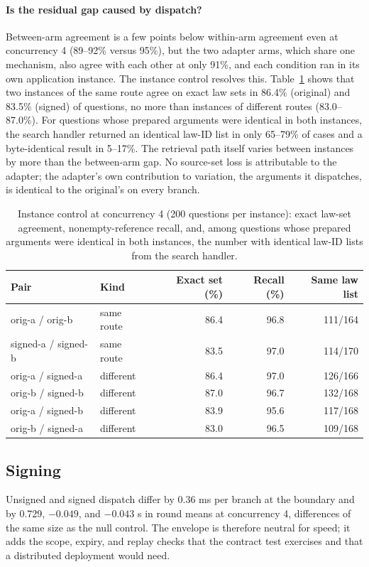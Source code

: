 \documentclass[paper]{ieice}
\begin{document}
\paragraph{Is the residual gap caused by dispatch?}
Between-arm agreement is a few points below within-arm agreement even at concurrency 4 (89--92\% versus 95\%), but the two adapter arms, which share one mechanism, also agree with each other at only 91\%, and each condition ran in its own application instance. The instance control resolves this. Table~\ref{tab:instance-followup} shows that two instances of the same route agree on exact law sets in 86.4\% (original) and 83.5\% (signed) of questions, no more than instances of different routes (83.0--87.0\%). For questions whose prepared arguments were identical in both instances, the search handler returned an identical law-ID list in only 65--79\% of cases and a byte-identical result in 5--17\%. The retrieval path itself varies between instances by more than the between-arm gap. No source-set loss is attributable to the adapter; the adapter's own contribution to variation, the arguments it dispatches, is identical to the original's on every branch.

\begin{table}[!htbp]
\caption{Instance control at concurrency 4 (200 questions per instance): exact law-set agreement, nonempty-reference recall, and, among questions whose prepared arguments were identical in both instances, the number with identical law-ID lists from the search handler.}
\label{tab:instance-followup}
\centering\footnotesize
\setlength{\tabcolsep}{2pt}
\begin{tabular}{llrrr}
\toprule
Pair & Kind & Exact set (\%) & Recall (\%) & Same law list\\
\midrule
orig-a / orig-b & same route & 86.4 & 96.8 & 111/164\\
signed-a / signed-b & same route & 83.5 & 97.0 & 114/170\\
orig-a / signed-a & different & 86.4 & 97.0 & 126/166\\
orig-b / signed-b & different & 87.0 & 96.7 & 132/168\\
orig-a / signed-b & different & 83.9 & 95.6 & 117/168\\
orig-b / signed-a & different & 83.0 & 96.5 & 109/168\\
\bottomrule
\end{tabular}
\end{table}

\subsection{Signing}
Unsigned and signed dispatch differ by 0.36 ms per branch at the boundary and by 0.729, $-0.049$, and $-0.043$ s in round means at concurrency 4, differences of the same size as the null control. The envelope is therefore neutral for speed; it adds the scope, expiry, and replay checks that the contract test exercises and that a distributed deployment would need.
\end{document}
